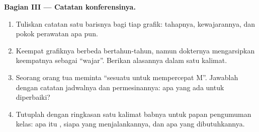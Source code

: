 \begin{problem}
\medskip\noindent\textbf{Bagian III --- Catatan
konferensinya.}
\begin{enumerate}[resume]
  \item Tuliskan catatan satu barisnya bagi tiap grafik:
        tahapnya, kewajarannya, dan pokok perawatan apa pun.
  \item Keempat grafiknya berbeda bertahun-tahun, namun
        dokternya mengarsipkan keempatnya sebagai ``wajar''.
        Berikan alasannya dalam satu kalimat.
  \item Seorang orang tua meminta ``sesuatu untuk
        mempercepat M''. Jawablah dengan catatan jadwalnya
        dan permesinannya: apa yang ada untuk diperbaiki?
  \item Tutuplah dengan ringkasan satu kalimat babnya untuk
        papan pengumuman kelas: apa itu , siapa yang
        menjalankannya, dan apa yang dibutuhkannya.
\end{enumerate}
\end{problem}
